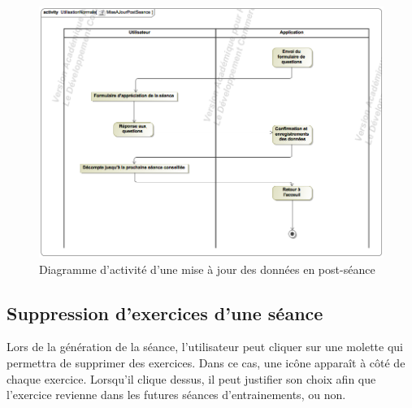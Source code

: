 \begin{figure}[!h]
\includegraphics[scale=0.3]{diagrams/post}
\centering
\caption{Diagramme d'activité d'une mise à jour des données en post-séance}
\end{figure}

\subsection*{Suppression d'exercices d'une séance}

Lors de la génération de la séance, l'utilisateur peut cliquer sur une molette qui permettra de supprimer des exercices. Dans ce cas, une icône apparaît à côté de chaque exercice. Lorsqu'il clique dessus, il peut justifier son choix afin que l'exercice revienne dans les futures séances d'entrainements, ou non.\\

